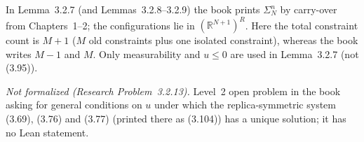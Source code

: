 \begin{remark}\label{rem:sg-tal:st-problem-3213}
In Lemma~3.2.7 (and Lemmas~3.2.8--3.2.9) the book prints $\Sigma_N^n$ by carry-over from Chapters~1--2; the
configurations lie in $(\mathbb R^{N+1})^R$. Here the total constraint count is $M+1$ ($M$ old constraints plus
one isolated constraint), whereas the book writes $M-1$ and $M$. Only measurability and $u\le0$ are used in
Lemma~3.2.7 (not (3.95)).

\emph{Not formalized (Research Problem~3.2.13).} Level~2 open problem in the book asking for general conditions
on $u$ under which the replica-symmetric system (3.69), (3.76) and (3.77) (printed there as (3.104)) has a
unique solution; it has no Lean statement.
\end{remark}


